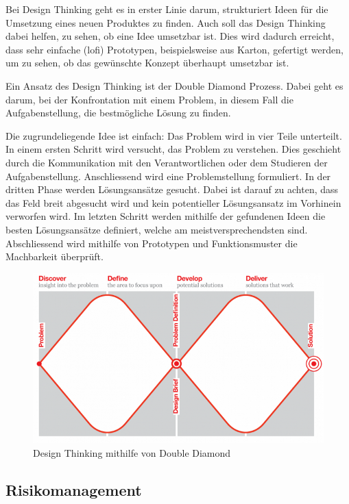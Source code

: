 Bei Design Thinking \cite{Wikipedia-Design-Thinking} geht es in erster Linie darum, strukturiert 
Ideen für die Umsetzung eines neuen Produktes zu finden. Auch soll das Design Thinking
dabei helfen, zu sehen, ob eine Idee umsetzbar ist. Dies wird dadurch erreicht,
dass sehr einfache (\acrshort{lofi}) Prototypen, beispielsweise aus Karton, 
gefertigt werden, um zu sehen, ob das gewünschte Konzept überhaupt umsetzbar ist.

Ein Ansatz des Design Thinking ist der Double Diamond Prozess. Dabei geht es darum, bei der Konfrontation mit einem Problem, in diesem Fall die Aufgabenstellung, die bestmögliche Lösung zu finden.

Die zugrundeliegende Idee ist einfach: Das Problem wird in vier Teile unterteilt.
In einem ersten Schritt wird versucht, das Problem zu verstehen. Dies geschieht durch die Kommunikation mit den Verantwortlichen oder dem Studieren der Aufgabenstellung.
Anschliessend wird eine Problemstellung formuliert.
In der dritten Phase werden Lösungsansätze gesucht. Dabei ist darauf zu achten, dass das Feld breit abgesucht wird und kein potentieller Lösungsansatz im Vorhinein verworfen wird.
Im letzten Schritt werden mithilfe der gefundenen Ideen die besten Lösungsansätze definiert, welche am meistversprechendsten sind.
Abschliessend wird mithilfe von Prototypen und Funktionsmuster die Machbarkeit überprüft.

\begin{figure}[H]
  \includegraphics[width=1.0\textwidth]{img/Aufgabenstellung/double-diamond.png}
  \centering
  \caption{Design Thinking mithilfe von Double Diamond}
\end{figure}
  
\subsection{Risikomanagement}
\label{sec:risikomanagement}

